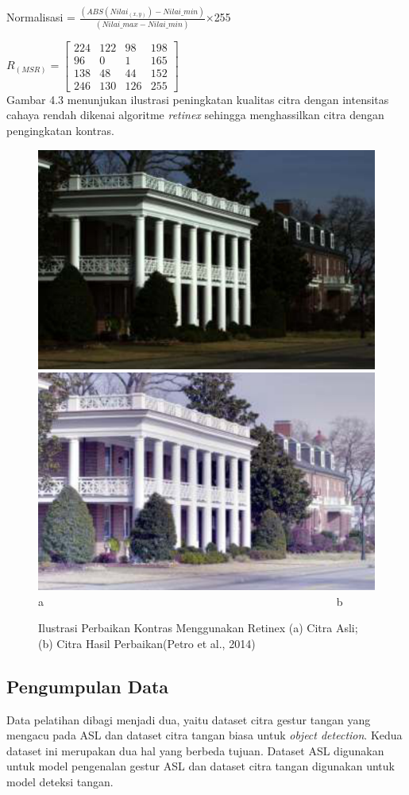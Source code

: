 \noindent Normalisasi = $\frac{(ABS(Nilai_{(x,y)})-Nilai\_min)}{(Nilai\_max-Nilai\_min)}$$\times$255

\noindent
$R_{(MSR)}=\left[
\begin{matrix}
224&	122&	98&		198\\
96&		0&		1&		165\\
138&	48&		44&		152\\
246&	130&	126&	255

\end{matrix}
\right]$\\
Gambar 4.3 menunjukan ilustrasi peningkatan kualitas citra dengan intensitas cahaya rendah dikenai algoritme \emph{retinex} sehingga menghassilkan citra dengan pengingkatan kontras.
\begin{figure}[H]
	\centering
	\includegraphics[width=0.4\linewidth]{ret1}
	\includegraphics[width=0.4\linewidth]{ret2}\\
	a \ \ \ \ \ \ \ \ \ \ \ \ \ \ \ \ \ \ \ \  \ \ \ \ \ \ \ \ \ \ \ \ \ \ \ \ \ \ \ \ \ \ \ \ \ \ \ \ \ \ \ \ b
	\caption{Ilustrasi Perbaikan Kontras Menggunakan Retinex (a) Citra Asli; (b) Citra Hasil Perbaikan(Petro et al., 2014)}
	\label{fig:ret1}
	\label{fig:ret2}
\end{figure}


\subsection{Pengumpulan Data}
Data pelatihan dibagi menjadi dua, yaitu dataset citra gestur tangan yang mengacu pada ASL dan dataset citra tangan biasa untuk \emph{object detection}.
Kedua dataset ini merupakan dua hal yang berbeda tujuan. 
Dataset ASL digunakan untuk model pengenalan gestur ASL dan dataset citra tangan digunakan untuk model deteksi tangan.

